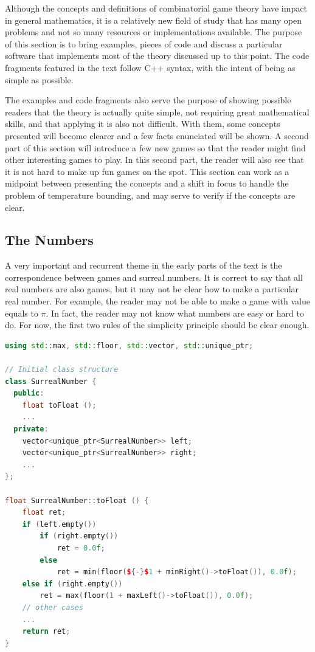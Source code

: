 Although the concepts and definitions of combinatorial game theory have impact in general mathematics, it is a relatively new field of study that has many open problems and not so many resources or implementations available. The purpose of this section is to bring examples, pieces of code and discuss a particular software that implements most of the theory discussed up to this point. The code fragments featured in the text follow C++ syntax, with the intent of being as simple as possible.

The examples and code fragments also serve the purpose of showing possible readers that the theory is actually quite simple, not requiring great mathematical skills, and that applying it is also not difficult. With them, some concepts presented will become clearer and a few facts enunciated will be shown. A second part of this section will introduce a few new games so that the reader might find other interesting games to play. In this second part, the reader will also see that it is not hard to make up fun games on the spot. This section can work as a midpoint between presenting the concepts and a shift in focus to handle the problem of temperature bounding, and may serve to verify if the concepts are clear.

\subsection*{The Numbers}

A very important and recurrent theme in the early parts of the text is the correspondence between games and surreal numbers. It is correct to say that all real numbers are also games, but it may not be clear how to make a particular real number. For example, the reader may not be able to make a game with value equals to $\pi$. In fact, the reader may not know what numbers are easy or hard to do. For now, the first two rules of the simplicity principle should be clear enough.

\begin{lstlisting}[language=C++]
using std::max, std::floor, std::vector, std::unique_ptr;

// Initial class structure
class SurrealNumber {
  public:
	float toFloat ();
	...
  private:
  	vector<unique_ptr<SurrealNumber>> left;
  	vector<unique_ptr<SurrealNumber>> right;
  	...
};

float SurrealNumber::toFloat () {
	float ret;
	if (left.empty())
		if (right.empty())
			ret = 0.0f;
		else
			ret = min(floor(${-}$1 + minRight()->toFloat()), 0.0f);
	else if (right.empty())
		ret = max(floor(1 + maxLeft()->toFloat()), 0.0f);
	// other cases
	...
	return ret;
}
\end{lstlisting}

